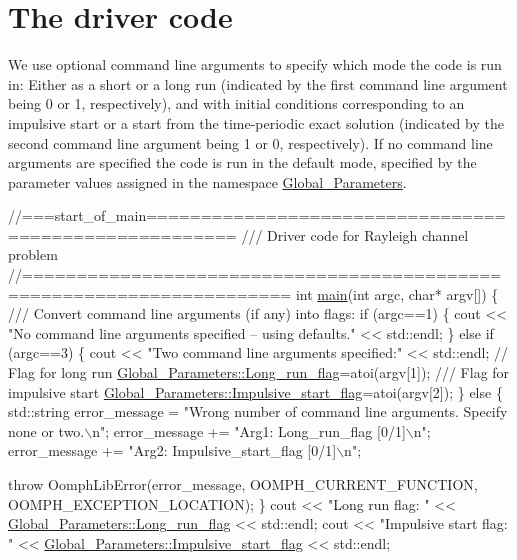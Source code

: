  

\hypertarget{index_main}{}\section{The driver code}\label{index_main}
We use optional command line arguments to specify which mode the code is run in\+: Either as a short or a long run (indicated by the first command line argument being 0 or 1, respectively), and with initial conditions corresponding to an impulsive start or a start from the time-\/periodic exact solution (indicated by the second command line argument being 1 or 0, respectively). If no command line arguments are specified the code is run in the default mode, specified by the parameter values assigned in the namespace {\ttfamily \hyperlink{namespaceGlobal__Parameters}{Global\+\_\+\+Parameters}}.


\begin{DoxyCodeInclude}
\textcolor{comment}{//===start\_of\_main======================================================}
\textcolor{comment}{/// Driver code for Rayleigh channel problem}
\textcolor{comment}{}\textcolor{comment}{//======================================================================}
\textcolor{keywordtype}{int} \hyperlink{rayleigh__channel_8cc_a0ddf1224851353fc92bfbff6f499fa97}{main}(\textcolor{keywordtype}{int} argc, \textcolor{keywordtype}{char}* argv[]) 
\{
\textcolor{comment}{}
\textcolor{comment}{ /// Convert command line arguments (if any) into flags:}
\textcolor{comment}{} \textcolor{keywordflow}{if} (argc==1)
  \{
   cout << \textcolor{stringliteral}{"No command line arguments specified -- using defaults."} 
        << std::endl;
  \}
 \textcolor{keywordflow}{else} \textcolor{keywordflow}{if} (argc==3)
  \{
   cout << \textcolor{stringliteral}{"Two command line arguments specified:"} << std::endl;
   \textcolor{comment}{// Flag for long run}
   \hyperlink{namespaceGlobal__Parameters_a457472b8222bb6bb0d97b2aed78d1ef4}{Global\_Parameters::Long\_run\_flag}=atoi(argv[1]);\textcolor{comment}{}
\textcolor{comment}{   /// Flag for impulsive start}
\textcolor{comment}{}   \hyperlink{namespaceGlobal__Parameters_aec41eb8da4929003e5d78ef4b43c0ed9}{Global\_Parameters::Impulsive\_start\_flag}=atoi(argv[2]);
  \}
 \textcolor{keywordflow}{else}
  \{
   std::string error\_message = 
    \textcolor{stringliteral}{"Wrong number of command line arguments. Specify none or two.\(\backslash\)n"};
   error\_message +=
    \textcolor{stringliteral}{"Arg1: Long\_run\_flag [0/1]\(\backslash\)n"};
   error\_message +=
    \textcolor{stringliteral}{"Arg2: Impulsive\_start\_flag [0/1]\(\backslash\)n"};

   \textcolor{keywordflow}{throw} OomphLibError(error\_message,
                       OOMPH\_CURRENT\_FUNCTION,
                       OOMPH\_EXCEPTION\_LOCATION);
  \}
 cout << \textcolor{stringliteral}{"Long run flag: "} 
      <<  \hyperlink{namespaceGlobal__Parameters_a457472b8222bb6bb0d97b2aed78d1ef4}{Global\_Parameters::Long\_run\_flag} << std::endl;
 cout << \textcolor{stringliteral}{"Impulsive start flag: "} 
      <<  \hyperlink{namespaceGlobal__Parameters_aec41eb8da4929003e5d78ef4b43c0ed9}{Global\_Parameters::Impulsive\_start\_flag} << std::endl;

\end{DoxyCodeInclude}


